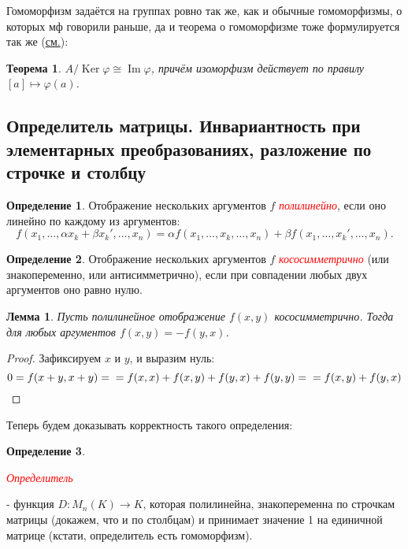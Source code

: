 \documentclass[a4paper,100pt]{article}
\theoremstyle{indented}
\newtheorem{theorem}{Теорема}
\newtheorem{lemma}{Лемма}
\theoremstyle{definition}
\newtheorem{defn}{Определение}
\theoremstyle{remark}
\DeclareMathOperator{\Ker}{Ker}
\DeclareMathOperator{\Imf}{Im}
\begin{document}
Гомоморфизм задаётся на группах ровно так же, как и обычные гомоморфизмы, о которых мф говорили раньше, да и теорема о гомоморфизме тоже формулируется так же (\hyperlink{n25}{см.}):

\begin{theorem}
    $A/\Ker \varphi \cong \Imf \varphi$, причём изоморфизм действует по правилу $[a]\mapsto \varphi(a)$.
\end{theorem}

\resetall

\subsection{Определитель матрицы. Инвариантность при элементарных преобразованиях, разложение по строчке и столбцу}

\begin{defn}
    Отображение нескольких аргументов $f$ \hypertarget{n95}{\textcolor{red}{\textit{полилинейно}}}, если оно линейно по каждому из аргументов:
    \[
        f(x_1, \dots, \alpha x_k+\beta x_k', \dots, x_n)=\alpha f(x_1, \dots, x_k, \dots, x_n)+\beta f(x_1, \dots, x_k', \dots, x_n).
    \]
\end{defn}

\begin{defn}
    Отображение нескольких аргументов $f$ \hypertarget{n96}{\textcolor{red}{\textit{кососимметрично}}} (или знакопеременно, или антисимметрично), если при совпадении любых двух аргументов оно равно нулю.
\end{defn}

\begin{lemma}
    Пусть полилинейное отображение $f(x, y)$ кососимметрично. Тогда для любых аргументов $f(x, y)=-f(y,x)$.
\end{lemma}

\begin{proof}
    Зафиксируем $x$ и $y$, и выразим нуль:
    \[
        0=f(x+y, x+y) = \\
        = f(x, x)+f(x, y)+f(y, x)+f(y, y) = \\
        = f(x, y)+f(y, x)
    \]
\end{proof}

Теперь будем доказывать корректность такого определения:

\begin{defn}
    \hypertarget{n97}{\textcolor{red}{\textit{Определитель}}} - функция $D:M_n(K)\rightarrow K$, которая полилинейна, знакопеременна по строчкам матрицы (докажем, что и по столбцам) и принимает значение 1 на единичной матрице (кстати, определитель есть гомоморфизм).
\end{defn}
\end{document}
